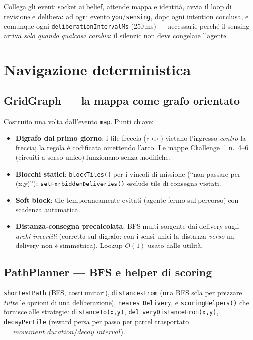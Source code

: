 \documentclass[11pt,a4paper]{article}
\newcommand{\code}[1]{\texttt{#1}}
\begin{document}
Collega gli eventi socket ai belief, attende mappa e identità, avvia il
loop di revisione e delibera: ad ogni evento \code{you}/\code{sensing},
dopo ogni intention conclusa, e comunque ogni
\code{deliberationIntervalMs} (250\,ms) — necessario perché il sensing
arriva \emph{solo quando qualcosa cambia}: il silenzio non deve congelare
l'agente.

\section{Navigazione deterministica}\label{sec:grafo}

\subsection{GridGraph — la mappa come grafo orientato}

Costruito una volta dall'evento \code{map}. Punti chiave:

\begin{itemize}
  \item \textbf{Digrafo dal primo giorno}: i tile freccia
    (\code{↑→↓←}) vietano l'ingresso \emph{contro} la freccia; la regola è
    codificata omettendo l'arco. Le mappe Challenge~1 n.~4--6 (circuiti a
    senso unico) funzionano senza modifiche.
  \item \textbf{Blocchi statici}: \code{blockTiles()} per i vincoli di
    missione (``non passare per (x,y)''); \code{setForbiddenDeliveries()}
    esclude tile di consegna vietati.
  \item \textbf{Soft block}: tile temporaneamente evitati (agente fermo
    sul percorso) con scadenza automatica.
  \item \textbf{Distanza-consegna precalcolata}: BFS multi-sorgente dai
    delivery sugli \emph{archi invertiti} (corretto sul digrafo: con i
    sensi unici la distanza \emph{verso} un delivery non è simmetrica).
    Lookup $O(1)$ usato dalle utilità.
\end{itemize}

\subsection{PathPlanner — BFS e helper di scoring}

\code{shortestPath} (BFS, costi unitari), \code{distancesFrom} (una BFS
sola per prezzare \emph{tutte} le opzioni di una deliberazione),
\code{nearestDelivery}, e \code{scoringHelpers()} che fornisce alle
strategie: \code{distanceTo(x,y)}, \code{deliveryDistanceFrom(x,y)},
\code{decayPerTile} (reward persa per passo per parcel trasportato
$= \mathit{movement\_duration} / \mathit{decay\_interval}$).
\end{document}
